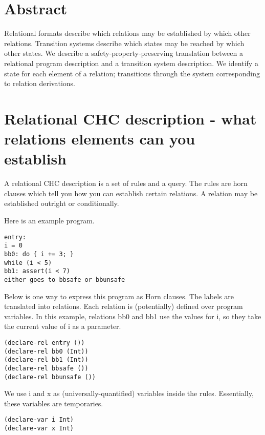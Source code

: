 \documentclass{article}
\begin{document}
\hypertarget{abstract}{%
\section{Abstract}\label{abstract}}

Relational formats describe which relations may be established by which
other relations. Transition systems describe which states may be reached
by which other states. We describe a safety-property-preserving
translation between a relational program description and a transition
system description. We identify a state for each element of a relation;
transitions through the system corresponding to relation derivations.

\hypertarget{relational-chc-description---what-relations-elements-can-you-establish}{%
\section{Relational CHC description - what relations elements can you
establish}\label{relational-chc-description---what-relations-elements-can-you-establish}}

A relational CHC description is a set of rules and a query. The rules
are horn clauses which tell you how you can establish certain relations.
A relation may be established outright or conditionally.

Here is an example program.

\begin{verbatim}
entry:
i = 0
bb0: do { i += 3; }
while (i < 5)
bb1: assert(i < 7)
either goes to bbsafe or bbunsafe
\end{verbatim}

Below is one way to express this program as Horn clauses.
The labels are translated into relations.
Each relation is (potentially) defined over
program variables.
In this example, relations bb0 and bb1 use
the values for i, so they take the current value of i as a parameter.

\begin{verbatim}
(declare-rel entry ())
(declare-rel bb0 (Int))
(declare-rel bb1 (Int))
(declare-rel bbsafe ())
(declare-rel bbunsafe ())
\end{verbatim}

We use i and x as (universally-quantified) variables inside the rules.
Essentially, these variables are temporaries.

\begin{verbatim}
(declare-var i Int)
(declare-var x Int)
\end{verbatim}
\end{document}
